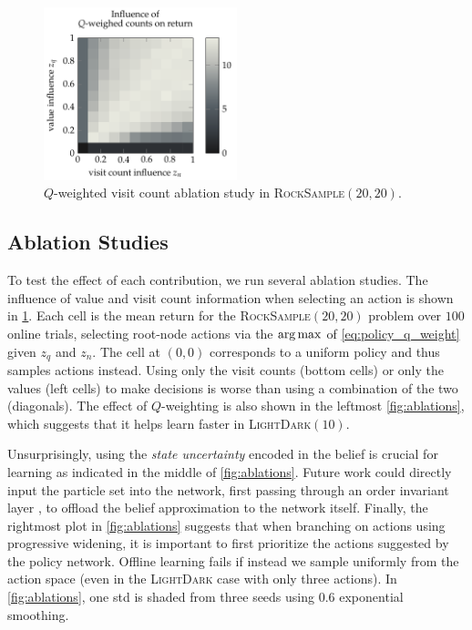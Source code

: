 \begin{figure}[b!]
    \centering
    \includegraphics[width=0.5\textwidth]{figures/betazero/results/z_sweep.pdf}
    \caption{$Q$-weighted visit count ablation study in \textsc{RockSample}$(20,20)$.}
    \label{fig:z_sweep}
\end{figure}


\subsection{Ablation Studies}\label{sec:betazero_ablation}
To test the effect of each contribution, we run several ablation studies.
The influence of value and visit count information when selecting an action is shown in \cref{fig:z_sweep}.
Each cell is the mean return for the \textsc{RockSample}$(20,20)$ problem over $100$ online trials, selecting root-node actions via the $\argmax$ of \cref{eq:policy_q_weight} given $z_q$ and $z_n$.
The cell at $(0,0)$ corresponds to a uniform policy and thus samples actions instead.
Using only the visit counts (bottom cells) or only the values (left cells) to make decisions is worse than using a combination of the two (diagonals).
The effect of $Q$-weighting is also shown in the leftmost \cref{fig:ablations}, which suggests that it helps learn faster in \textsc{LightDark}$(10)$.

Unsurprisingly, using the \textit{state uncertainty} encoded in the belief is crucial for learning as indicated in the middle of \cref{fig:ablations}.
Future work could directly input the particle set into the network, first passing through an order invariant layer \cite{zaheer2017deep}, to offload the belief approximation to the network itself.
Finally, the rightmost plot in \cref{fig:ablations} suggests that when branching on actions using progressive widening, it is important to first prioritize the actions suggested by the policy network.
Offline learning fails if instead we sample uniformly from the action space (even in the \textsc{LightDark} case with only three actions).
In \cref{fig:ablations}, one std is shaded from three seeds using $0.6$ exponential smoothing.



